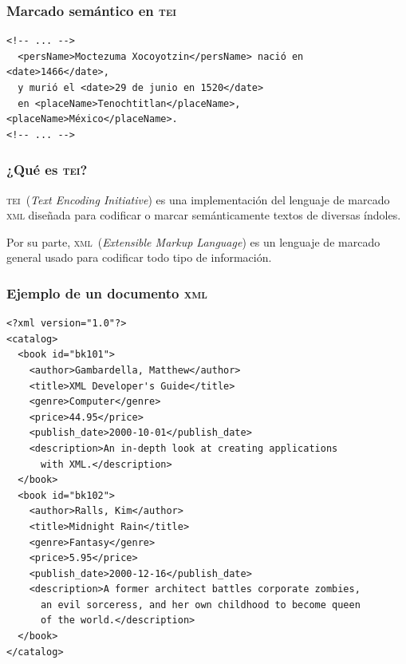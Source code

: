 \documentclass[%
  handout, %
  xcolor=svgnames]{beamer}
\newcommand*{\rojo}[1]{\textcolor[HTML]{8B0000}{#1}}
\newcommand*{\azul}[1]{\textcolor[HTML]{14145A}{#1}}
\newcommand*{\TEI}{\textsc{tei}}
\newcommand*{\XML}{\textsc{xml}}
\begin{document}
\begin{frame}[fragile]
  \frametitle{Marcado semántico en \TEI}

  \begin{verbatim}
<!-- ... --> 
  <persName>Moctezuma Xocoyotzin</persName> nació en <date>1466</date>, 
  y murió el <date>29 de junio en 1520</date>
  en <placeName>Tenochtitlan</placeName>, <placeName>México</placeName>.
<!-- ... --> 
\end{verbatim}
  
\end{frame}


\begin{frame}
  \frametitle{¿Qué es \TEI?}

\large\centering
  
\rojo{\TEI\ ({\small\textit{Text Encoding Initiative}})} es una implementación del lenguaje de marcado \azul{\XML} diseñada para codificar o marcar semánticamente textos de diversas índoles.

\bigskip

Por su parte, \azul{\XML\ ({\small\textit{Extensible Markup Language}})} es un lenguaje de marcado general usado para codificar todo tipo de información.
\end{frame}


\begin{frame}[fragile]
  \frametitle{Ejemplo de un documento \XML}
\scriptsize
  \begin{verbatim}
<?xml version="1.0"?>
<catalog>
  <book id="bk101">
    <author>Gambardella, Matthew</author>
    <title>XML Developer's Guide</title>
    <genre>Computer</genre>
    <price>44.95</price>
    <publish_date>2000-10-01</publish_date>
    <description>An in-depth look at creating applications 
      with XML.</description>
  </book>
  <book id="bk102">
    <author>Ralls, Kim</author>
    <title>Midnight Rain</title>
    <genre>Fantasy</genre>
    <price>5.95</price>
    <publish_date>2000-12-16</publish_date>
    <description>A former architect battles corporate zombies, 
      an evil sorceress, and her own childhood to become queen 
      of the world.</description>
  </book>
</catalog>
  \end{verbatim}
\end{frame}
\end{document}

